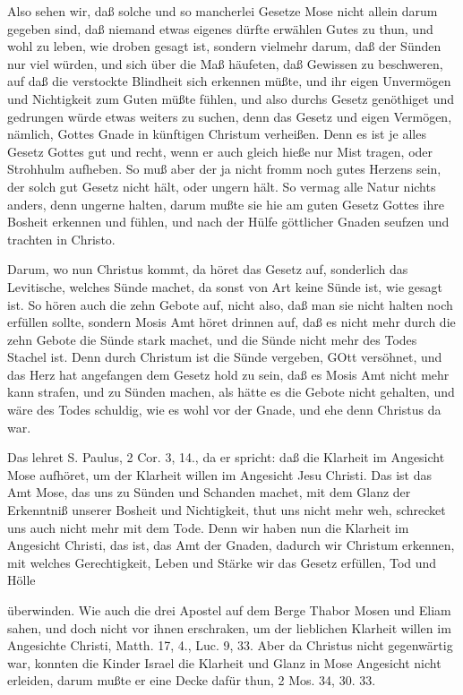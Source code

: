 Also sehen wir, daß solche und so mancherlei Gesetze Mose nicht allein darum gegeben sind, daß niemand etwas eigenes dürfte erwählen Gutes zu thun, und wohl zu leben, wie droben gesagt ist, sondern vielmehr darum, daß der Sünden nur viel würden, und sich über die Maß häufeten, daß Gewissen zu beschweren, auf daß die verstockte Blindheit sich erkennen müßte, und ihr eigen Unvermögen und Nichtigkeit zum Guten müßte fühlen, und also durchs Gesetz genöthiget und gedrungen würde etwas weiters zu suchen, denn das Gesetz und eigen Vermögen, nämlich, Gottes Gnade in künftigen Christum verheißen. Denn es ist je alles Gesetz Gottes gut und recht, wenn er auch gleich hieße nur Mist tragen, oder Strohhulm aufheben. So muß aber der ja nicht fromm noch gutes Herzens sein, der solch gut Gesetz nicht hält, oder ungern hält. So vermag alle Natur nichts anders, denn ungerne halten, darum mußte sie hie am guten Gesetz Gottes ihre Bosheit erkennen und fühlen, und nach der Hülfe göttlicher Gnaden seufzen und trachten in Christo.

Darum, wo nun Christus kommt, da höret das Gesetz auf, sonderlich das Levitische, welches Sünde machet, da sonst von Art keine Sünde ist, wie gesagt ist. So hören auch die zehn Gebote auf, nicht also, daß man sie nicht halten noch erfüllen sollte, sondern Mosis Amt höret drinnen auf, daß es nicht mehr durch die zehn Gebote die Sünde stark machet, und die Sünde nicht mehr des Todes Stachel ist. Denn durch Christum ist die Sünde vergeben, GOtt versöhnet, und das Herz hat angefangen dem Gesetz hold zu sein, daß es Mosis Amt nicht mehr kann strafen, und zu Sünden machen, als hätte es die Gebote nicht gehalten, und wäre des Todes schuldig, wie es wohl vor der Gnade, und ehe denn Christus da war.

Das lehret S. Paulus, 2 Cor. 3, 14., da er spricht: daß die Klarheit im Angesicht Mose aufhöret, um der Klarheit willen im Angesicht Jesu Christi. Das ist das Amt Mose, das uns zu Sünden und Schanden machet, mit dem Glanz der Erkenntniß unserer Bosheit und Nichtigkeit, thut uns nicht mehr weh, schrecket uns auch nicht mehr mit dem Tode. Denn wir haben nun die Klarheit im Angesicht Christi, das ist, das Amt der Gnaden, dadurch wir Christum erkennen, mit welches Gerechtigkeit, Leben und Stärke wir das Gesetz erfüllen, Tod und Hölle


überwinden. Wie auch die drei Apostel auf dem Berge Thabor Mosen und Eliam sahen, und doch nicht vor ihnen erschraken, um der lieblichen Klarheit willen im Angesichte Christi, Matth. 17, 4., Luc. 9, 33. Aber da Christus nicht gegenwärtig war, konnten die Kinder Israel die Klarheit und Glanz in Mose Angesicht nicht erleiden, darum mußte er eine Decke dafür thun, 2 Mos. 34, 30. 33.


